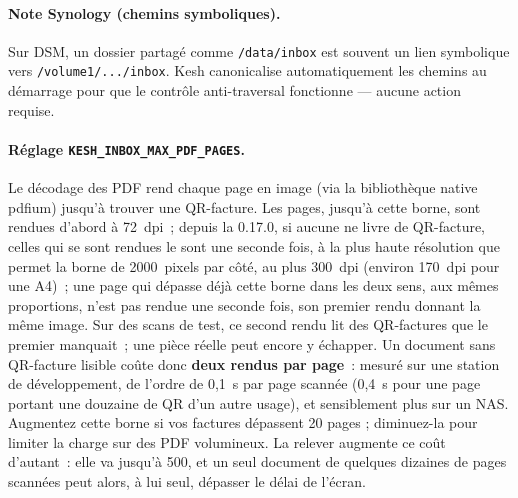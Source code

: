\documentclass[a4paper,11pt,oneside]{article}
\begin{document}
\paragraph{Note Synology (chemins symboliques).} Sur DSM, un dossier partagé
comme \texttt{/data/inbox} est souvent un lien symbolique vers
\texttt{/volume1/.../inbox}. Kesh canonicalise automatiquement les chemins au
démarrage pour que le contrôle anti-traversal fonctionne — aucune action requise.

\paragraph{Réglage \texttt{KESH\_INBOX\_MAX\_PDF\_PAGES}.} Le décodage des PDF
rend chaque page en image (via la bibliothèque native pdfium) jusqu'à trouver une
QR-facture. Les pages, jusqu'à cette borne, sont rendues d'abord à 72~dpi~; depuis la
0.17.0, si aucune ne livre de QR-facture, celles qui se sont rendues le sont une seconde
fois, à la plus haute résolution que permet la borne de 2000~pixels par côté, au plus
300~dpi (environ 170~dpi pour une A4)~; une page qui dépasse déjà cette borne dans les deux
sens, aux mêmes proportions, n'est pas rendue une seconde fois, son premier rendu donnant la
même image. Sur des scans de test, ce second rendu lit des QR-factures que le premier
manquait~; une pièce réelle peut encore y échapper. Un document sans QR-facture lisible coûte donc \textbf{deux rendus par
page}~: mesuré sur une station de développement, de l'ordre de 0,1~s par page scannée
(0,4~s pour une page portant une douzaine de QR d'un autre usage), et sensiblement plus
sur un NAS. Augmentez cette borne si vos factures dépassent 20 pages ; diminuez-la pour
limiter la charge sur des PDF volumineux. La relever augmente ce coût d'autant~: elle va
jusqu'à 500, et un seul document de quelques dizaines de pages scannées peut alors, à lui
seul, dépasser le délai de l'écran.
\end{document}
